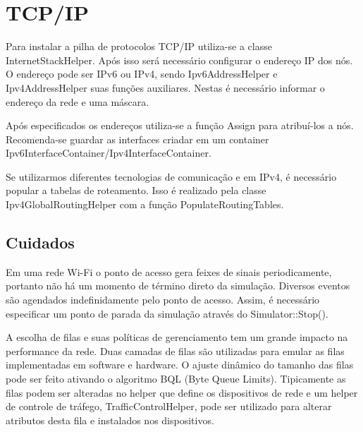 \documentclass[14pt]{extarticle}
\begin{document}
\section{TCP/IP}

Para instalar a pilha de protocolos TCP/IP utiliza-se a classe InternetStackHelper. Após isso será necessário configurar
o endereço IP dos nós. O endereço pode ser IPv6 ou IPv4, sendo Ipv6AddressHelper e Ipv4AddressHelper suas funções
auxiliares. Nestas é necessário informar o endereço da rede e uma máscara.

Após especificados os endereços utiliza-se a função Assign para atribuí-los a nós. Recomenda-se guardar as interfaces
criadar em um container Ipv6InterfaceContainer/Ipv4InterfaceContainer.

Se utilizarmos diferentes tecnologias de comunicação e em IPv4, é necessário popular a tabelas de roteamento. Isso é realizado
pela classe Ipv4GlobalRoutingHelper com a função PopulateRoutingTables.

\subsection{Cuidados}

Em uma rede Wi-Fi o ponto de acesso gera feixes de sinais periodicamente, portanto não há um momento de término direto
da simulação. Diversos eventos são agendados indefinidamente pelo ponto de acesso. Assim, é necessário especificar um
ponto de parada da simulação através do Simulator::Stop().

A escolha de filas e suas políticas de gerenciamento tem um grande impacto na performance da rede. Duas camadas de filas
são utilizadas para emular as filas implementadas em software e hardware. O ajuste dinâmico do tamanho das filas pode
ser feito ativando o algoritmo BQL (Byte Queue Limits). Tipicamente as filas podem ser alteradas no helper que define os
dispositivos de rede e um helper de controle de tráfego, TrafficControlHelper, pode ser utilizado para alterar atributos
desta fila e instalados nos dispositivos.
\end{document}
